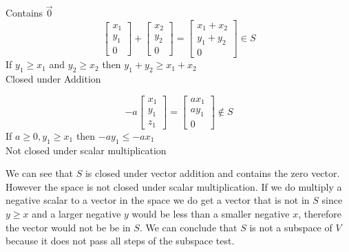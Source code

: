 \documentclass[12pt]{article}
\begin{document}
\begin{center}Contains $\vec{0}$
\\
\begin{equation*}
\begin{bmatrix}
x_1 \\ y_1 \\ 0
\end{bmatrix} + \begin{bmatrix}
x_2 \\ y_2 \\ 0
\end{bmatrix} = \begin{bmatrix}
x_1+x_2 \\ y_1+y_2 \\ 0
\end{bmatrix} \in S
\end{equation*}
If $y_1 \geq x_1 $ and $y_2 \geq x_2$ then $y_1+y_2 \geq x_1+x_2$\\
Closed under Addition \\
\end{center}
\begin{center}
\begin{equation*}
-a\begin{bmatrix}
x_1 \\ y_1 \\ z_1
\end{bmatrix}= \begin{bmatrix}
ax_1 \\ ay_1 \\0
\end{bmatrix} \notin S
\end{equation*}
If $a \ge 0,  y_1 \geq x_1 $ then $-ay_1\leq -ax_1$\\
Not closed under scalar multiplication
\end{center}
We can see that $S$ is closed under vector addition and contains the zero vector. However the space is not closed under scalar multiplication. If we do multiply a negative scalar to a vector in the space we do get a vector that is not in $S$ since $y\geq x$ and a larger negative $y$ would be less than a smaller negative $ x$, therefore the vector would not be be in $S$.
We can conclude that $S$ is not a subspace of $V$ because it does not pass all steps of the subspace test.
\end{document}
